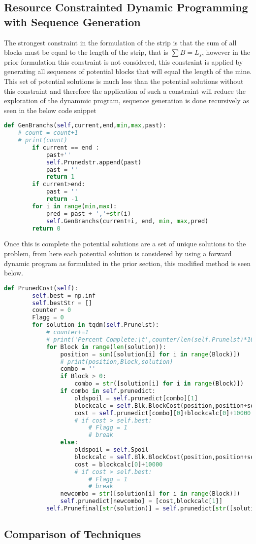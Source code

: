 \subsection{Resource Constrainted Dynamic Programming with Sequence Generation}
The strongest constraint in the formulation of the strip is that the sum of all blocks must be equal to the length of the strip, that is $\sum B = L_s$, however in the prior formulation this constraint is not considered, this constraint is applied by generating all sequences of potential blocks that will equal the length of the mine. This set of potential solutions is much less than the potential solutions without this constraint and therefore the application of such a constraint will reduce the exploration of the dynammic program, sequence generation is done recursively as seen in the below code snippet 
\begin{lstlisting}[language = python]
def GenBranchs(self,current,end,min,max,past):
	# count = count+1
	# print(count)
		if current == end :
			past+''
			self.Prunedstr.append(past)
			past = ''
			return 1
		if current>end:
			past = ''
			return -1
		for i in range(min,max):
			pred = past + ','+str(i)
			self.GenBranchs(current+i, end, min, max,pred)
		return 0
\end{lstlisting}
Once this is complete the potential solutions are a set of unique solutions to the problem, from here each potential solution is considered by using a forward dynamic program as formulated in the prior section, this modified method is seen below. 
\begin{lstlisting}[language = python]
def PrunedCost(self):
		self.best = np.inf
		self.bestStr = []
		counter = 0
		Flagg = 0
		for solution in tqdm(self.Prunelst):
			# counter+=1
			# print('Percent Complete:\t',counter/len(self.Prunelst)*100,'%')
			for Block in range(len(solution)):
				position = sum([solution[i] for i in range(Block)])
				# print(position,Block,solution)
				combo = ''
				if Block > 0:
					combo = str([solution[i] for i in range(Block)])
				if combo in self.prunedict:
					oldspoil = self.prunedict[combo][1]
					blockcalc = self.Blk.BlockCost(position,position+solution[Block],oldspoil)
					cost = self.prunedict[combo][0]+blockcalc[0]+10000
					# if cost > self.best:
						# Flagg = 1
						# break
				else:
					oldspoil = self.Spoil
					blockcalc = self.Blk.BlockCost(position,position+solution[Block],oldspoil)
					cost = blockcalc[0]+10000
					# if cost > self.best:
						# Flagg = 1
						# break
				newcombo = str([solution[i] for i in range(Block)])
				self.prunedict[newcombo] = [cost,blockcalc[1]]
			self.Prunefinal[str(solution)] = self.prunedict[str([solution[i] for i in range(Block)])]

\end{lstlisting}
\subsection{Comparison of Techniques}




